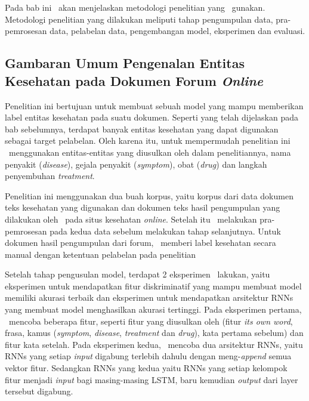 \chapter{\babTiga}
Pada bab ini \saya~akan menjelaskan metodologi penelitian yang \saya~gunakan. Metodologi penelitian yang dilakukan meliputi tahap pengumpulan data, pra-pemrosesan data, pelabelan data, pengembangan model, eksperimen dan evaluasi.

\section{Gambaran Umum Pengenalan Entitas Kesehatan pada Dokumen Forum \textit{Online}}
Penelitian ini bertujuan untuk membuat sebuah model yang mampu memberikan label entitas kesehatan pada suatu dokumen. Seperti yang telah dijelaskan pada bab sebelumnya, terdapat banyak entitas kesehatan yang dapat digunakan sebagai target pelabelan. Oleh karena itu, untuk mempermudah penelitian ini \saya~menggunakan entitas-entitas yang diusulkan oleh \cite{skripsiKakRadit} dalam penelitiannya,  nama penyakit (\textit{disease}), gejala penyakit (\textit{symptom}), obat (\textit{drug}) dan langkah penyembuhan \textit{treatment}.

Penelitian ini menggunakan dua buah korpus, yaitu korpus dari data dokumen teks kesehatan yang digunakan \cite{skripsiKakRadit} dan dokumen teks hasil pengumpulan yang dilakukan oleh \saya~pada situs kesehatan \textit{online}. Setelah itu \saya~melakukan pra-pemrosesan pada kedua data sebelum melakukan tahap selanjutnya. Untuk dokumen hasil pengumpulan dari forum, \saya~memberi label kesehatan secara manual dengan ketentuan pelabelan pada penelitian \cite{skripsiKakRadit}

Setelah tahap pengusulan model, terdapat 2 eksperimen \saya~lakukan, yaitu eksperimen untuk mendapatkan fitur diskriminatif yang mampu membuat model memiliki akurasi terbaik dan eksperimen untuk mendapatkan arsitektur RNNs yang membuat model menghasilkan akurasi tertinggi. Pada eksperimen pertama, \saya~mencoba beberapa fitur, seperti fitur yang diusulkan oleh \cite{skripsiKakRadit} (fitur \textit{its own word}, frasa, kamus (\textit{symptom}, \textit{disease}, \textit{treatment} dan \textit{drug}), kata pertama sebelum) dan fitur kata setelah. Pada eksperimen kedua, \saya~mencoba dua arsitektur RNNs, yaitu RNNs yang setiap \textit{input} digabung terlebih dahulu dengan meng-\textit{append} semua vektor fitur. Sedangkan RNNs yang kedua yaitu RNNs yang setiap kelompok fitur menjadi \textit{input} bagi masing-masing LSTM, baru kemudian \textit{output} dari layer tersebut digabung.

